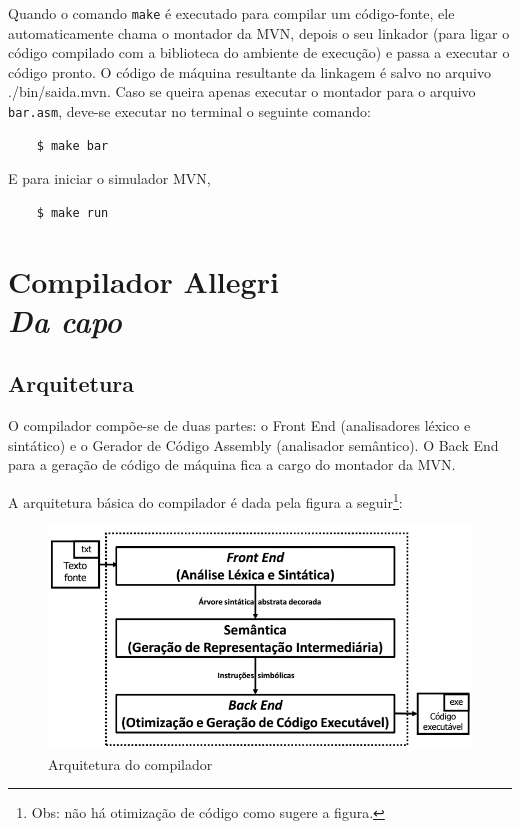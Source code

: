 \documentclass[a4paper,12pt]{report}
\begin{document}
    Quando o comando \verb|make| é executado para compilar um código-fonte, ele automaticamente chama o montador da MVN, depois o seu linkador (para ligar o código compilado com a biblioteca do ambiente de execução) e passa a executar o código pronto. O código de máquina resultante da linkagem é salvo no arquivo ./bin/saida.mvn. Caso se queira apenas executar o montador para o arquivo \verb|bar.asm|, deve-se executar no terminal o seguinte comando:

    \begin{verbatim}
    $ make bar \end{verbatim}

    E para iniciar o simulador MVN,

    \begin{verbatim}
    $ make run \end{verbatim}



    \part*{Compilador Allegri\\\textit{Da capo}}


    \chapter*{Arquitetura}
    O compilador compõe-se de duas partes: o Front End (analisadores léxico e sintático) e o Gerador de Código Assembly (analisador semântico). O Back End para a geração de código de máquina fica a cargo do montador da MVN.

    A arquitetura básica do compilador é dada pela figura a seguir\footnote{Obs: não há otimização de código como sugere a figura.}: 


    \begin{figure}[h]
        \caption{Arquitetura do compilador}
        \centering
        \includegraphics[scale=.5]{esqueleto}
    \end{figure}
\end{document}
